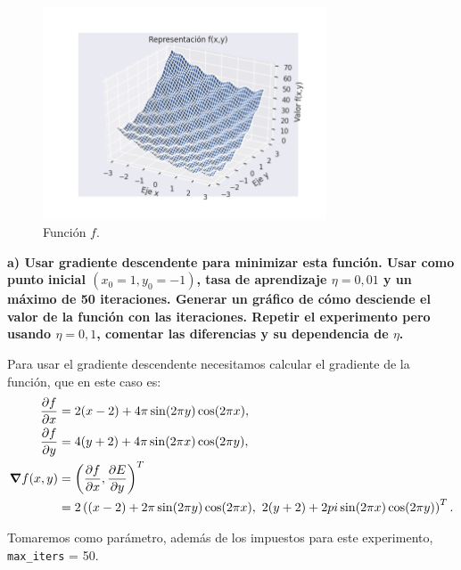 \documentclass[a4paper, 20pt]{article}
\begin{document}
\begin{figure}[H]
    \centering
    \includegraphics[width=0.75\textwidth]{f1}
    \caption{Función $f$.}
    \label{fig:f1}
\end{figure}

\textbf{a) Usar gradiente descendente para minimizar esta función. Usar como punto inicial $(x_0 = 1, y_0 = -1)$, tasa de aprendizaje $\eta = 0,01$ y un máximo de 50 iteraciones.
Generar un gráfico de cómo desciende el valor de la función con las iteraciones. Repetir
el experimento pero usando $\eta = 0,1$, comentar las diferencias y su dependencia de $\eta$.}

Para usar el gradiente descendente necesitamos calcular el gradiente de la función, que en este caso es:
\begin{align*}
\pdv{f}{x}(x,y) &= 2(x-2) + 4\pi \sin(2\pi y) \cos(2\pi x),\\
\pdv{f}{y}(x,y) &= 4(y+2)+4\pi \sin(2\pi x) \cos(2\pi y),\\
\grad{f}(x,y) &= \left(\pdv{f}{x}(x,y), \pdv{E}{y}(x,y)\right)^T\\
	      &= 2\left((x-2) + 2\pi \sin(2\pi y) \cos(2\pi x),\ 2(y+2)+2pi \sin(2\pi x) \cos(2\pi y)\right)^T.
\end{align*}

Tomaremos como parámetro, además de los impuestos para este experimento, \texttt{max\_iters} = 50.
\end{document}
